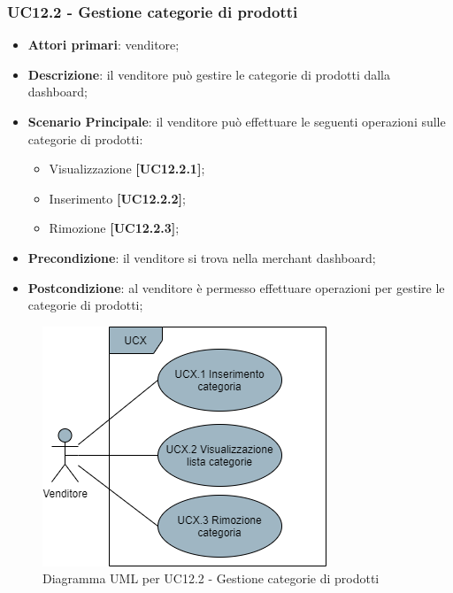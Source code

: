 \subsubsection{UC12.2 - Gestione categorie di prodotti}
\begin{itemize}
\item \textbf{Attori primari}: venditore;
\item \textbf{Descrizione}: il venditore può gestire le categorie di prodotti dalla dashboard;
\item \textbf{Scenario Principale}: il venditore può effettuare le seguenti operazioni sulle categorie di prodotti:
\begin{itemize}
	\item Visualizzazione \textbf{[UC12.2.1]};
	\item Inserimento \textbf{[UC12.2.2]};
	\item Rimozione \textbf{[UC12.2.3]};
\end{itemize}
\item \textbf{Precondizione}: il venditore si trova nella merchant dashboard;
\item \textbf{Postcondizione}: al venditore è permesso effettuare operazioni per gestire le categorie di prodotti;
\end{itemize}

\begin{figure}[H]
\centering
\includegraphics[scale=0.6]{res/UseCase/Immagini/GestioneCategorie}
\caption{Diagramma UML per UC12.2 - Gestione categorie di prodotti}
\end{figure}


